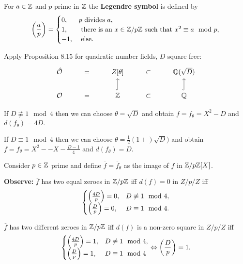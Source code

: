 \begin{remin}
For $a \in \mathbb{Z}$ and $p$ prime in $\mathbb{Z}$ the \textbf{Legendre symbol} is defined by
\[ \left(\frac{a}{p}\right) = \begin{cases}
0, & p \text{ divides } a, \\
1, & \text{ there is an } x \in \mathbb{Z} / p\mathbb{Z} \text{ such that } x^2 \equiv a \mod p,\\
-1, & \text{ else.}\\
\end{cases}
\]
\end{remin}

\begin{Bsp}
Apply Proposition 8.15 for quadratic number fields, $D$ square-free:
\[ \begin{tikzcd}
\hat{\O} 
	& = & Z[\theta] 
	& \subset & \Q(\sqrt{D}) \\
\O 
	& = & \Z
		\arrow[u, hook]
	&  \subset & \Q
		\arrow[u, hook]
\end{tikzcd}
\]
\end{Bsp}


\begin{remin}
	If $D \not\equiv 1 \mod 4$ then we can choose $\theta = \sqrt{D}$ and obtain
	$f = f_\theta = X^2- D$ and $d(f_\theta) = 4D$.
	
	
	If $D \equiv 1 \mod 4$ then we can choose $\theta = \frac{1}{2}(1+)\sqrt{D})$ and obtain
	$f = f_\theta = X^2- -X - \frac{D-1}{4}$ and $d(f_\theta) = D$.
\end{remin}

Consider $p \in\mathbb{Z}$ prime and define $\overline{f} = \overline{f}_\theta$ as the image of $f$ in $\mathbb{Z} / p\mathbb{Z} [X]$.

\bigskip
\textbf{Observe:} $\overline{f}$ has two equal zeroes in $\mathbb{Z} / p\mathbb{Z}$ iff $d(f) = 0$ in $Z / p/Z$ iff 
\[ \begin{cases}
\left(\frac{4D}{p}\right) = 0, & D \not \equiv 1 \mod 4, \\
\left(\frac{D}{p}\right) = 0, & D \equiv 1 \mod 4. \\
\end{cases}
\]

\bigskip $\overline{f}$ has two different zeroes in  $\mathbb{Z} / p\mathbb{Z}$ iff $d(f)$ is a non-zero square in $Z / p/Z$ iff 
\[ \begin{cases}
\left(\frac{4D}{p}\right) = 1, & D \not \equiv 1 \mod 4, \\
\left(\frac{D}{p}\right) = 1, & D \equiv 1 \mod 4 \\
\end{cases}
\Leftrightarrow \left(\frac{D}{p}\right) = 1.
\]

